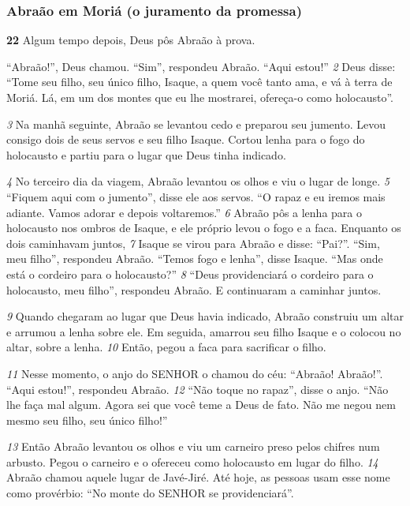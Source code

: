 \bigskip   
\subsubsection*{Abraão em Moriá (o juramento da promessa)}
\textbf{\large 22}
 Algum tempo depois, Deus pôs Abraão à prova. 

\bigskip   
“Abraão!”, Deus chamou.
   “Sim”, respondeu Abraão. “Aqui estou!”
\textit{\tiny 2}
Deus disse: “Tome seu filho, seu único filho, Isaque, a quem você tanto ama, e
vá à terra de Moriá. Lá, em um dos montes que eu lhe mostrarei, ofereça-o como
holocausto”.

\bigskip   
\textit{\tiny 3}
Na manhã seguinte, Abraão se levantou cedo e preparou seu jumento. Levou
consigo dois de seus servos e seu filho Isaque. Cortou lenha para o fogo do
holocausto e partiu para o lugar que Deus tinha indicado. 

\bigskip   
\textit{\tiny 4}
No terceiro dia da
viagem, Abraão levantou os olhos e viu o lugar de longe. 
\textit{\tiny 5}
“Fiquem aqui com o
jumento”, disse ele aos servos. “O rapaz e eu iremos mais adiante. Vamos adorar e
depois voltaremos.”
\textit{\tiny 6}
Abraão pôs a lenha para o holocausto nos ombros de Isaque, e ele próprio
levou o fogo e a faca. 
Enquanto os dois caminhavam juntos, 
\textit{\tiny 7}
Isaque se virou para
Abraão e disse: “Pai?”.
   “Sim, meu filho”, respondeu Abraão.
   “Temos fogo e lenha”, disse Isaque. “Mas onde está o cordeiro para o
holocausto?”
\textit{\tiny 8}
“Deus providenciará o cordeiro para o holocausto, meu filho”, respondeu
Abraão. E continuaram a caminhar juntos.

\bigskip   
\textit{\tiny 9}
Quando chegaram ao lugar que Deus havia indicado, Abraão construiu um
altar e arrumou a lenha sobre ele. Em seguida, amarrou seu filho Isaque e o
colocou no altar, sobre a lenha. 
\textit{\tiny 10}
Então, pegou a faca para sacrificar o filho.

\bigskip   
\textit{\tiny 11}
Nesse momento, o anjo do SENHOR o chamou do céu: “Abraão! Abraão!”.
   “Aqui estou!”, respondeu Abraão.
\textit{\tiny 12}
“Não toque no rapaz”, disse o anjo. “Não lhe faça mal algum. Agora sei que
você teme a Deus de fato. Não me negou nem mesmo seu filho, seu único filho!”

\bigskip   
\textit{\tiny 13}
Então Abraão levantou os olhos e viu um carneiro preso pelos chifres num
arbusto. Pegou o carneiro e o ofereceu como holocausto em lugar do filho.
\textit{\tiny 14}
Abraão chamou aquele lugar de Javé-Jiré. Até hoje, as pessoas usam esse nome
como provérbio: “No monte do SENHOR se providenciará”.

